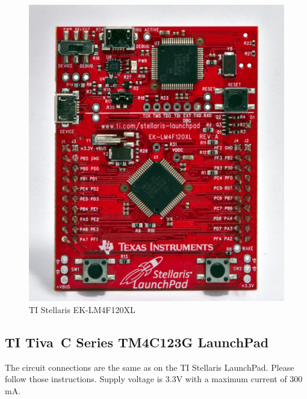 \documentclass[twoside,11pt]{cergdoc}
\begin{document}
\begin{figure}[ht]
  \begin{center}
    \includegraphics[scale=0.6]{figures/ek-lm4f120xl}
    \caption{TI Stellaris EK-LM4F120XL}\label{fig:stellaris}
  \end{center}
\vspace{-1ex}
\end{figure}

\subsection{TI Tiva\texttrademark~C Series TM4C123G LaunchPad}

The circuit connections are the same as on the TI Stellaris LaunchPad. Please follow
those instructions. Supply voltage is 3.3V with a maximum current of 300\,mA.
\end{document}
